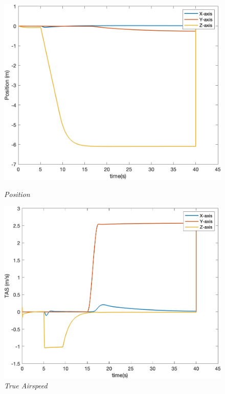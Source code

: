 \begin{figure}[htbp]
  \centering
  \begin{minipage}[b]{0.45\textwidth}
    \centering
    \includegraphics[width=\textwidth]{Images/Gust/VTOL step/1 position_5.jpg}
    \caption*{\textit{Position}}
  \end{minipage}
  \hfil
  \begin{minipage}[b]{0.45\textwidth}
    \centering
    \includegraphics[width=\textwidth]{Images/Gust/VTOL step/2 airspeed_5.jpg}
    \caption*{\textit{True Airspeed}}
  \end{minipage}
  \begin{minipage}[b]{0.45\textwidth}

\end{minipage}
\end{figure}
